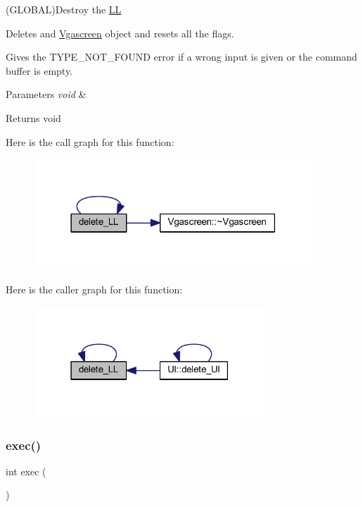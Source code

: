 (G\+L\+O\+B\+AL)Destroy the \mbox{\hyperlink{namespace_l_l}{LL}} 

Deletes and \mbox{\hyperlink{class_vgascreen}{Vgascreen}} object and resets all the flags.

Gives the T\+Y\+P\+E\+\_\+\+N\+O\+T\+\_\+\+F\+O\+U\+ND error if a wrong input is given or the command buffer is empty.


\begin{DoxyParams}{Parameters}
{\em void} & \\
\hline
\end{DoxyParams}
\begin{DoxyReturn}{Returns}
void 
\end{DoxyReturn}
Here is the call graph for this function\+:\nopagebreak
\begin{figure}[H]
\begin{center}
\leavevmode
\includegraphics[width=297pt]{namespace_l_l_a78899c6737310be03f8a2f05f9d7e09e_cgraph}
\end{center}
\end{figure}
Here is the caller graph for this function\+:\nopagebreak
\begin{figure}[H]
\begin{center}
\leavevmode
\includegraphics[width=247pt]{namespace_l_l_a78899c6737310be03f8a2f05f9d7e09e_icgraph}
\end{center}
\end{figure}
\mbox{\label{namespace_l_l_ac98bc19f4e3468b76cfc2e43456527cc}} 
\subsubsection{\texorpdfstring{exec()}{exec()}}
{\footnotesize\ttfamily int exec (\begin{DoxyParamCaption}\item[{void}]{ }\end{DoxyParamCaption})}



